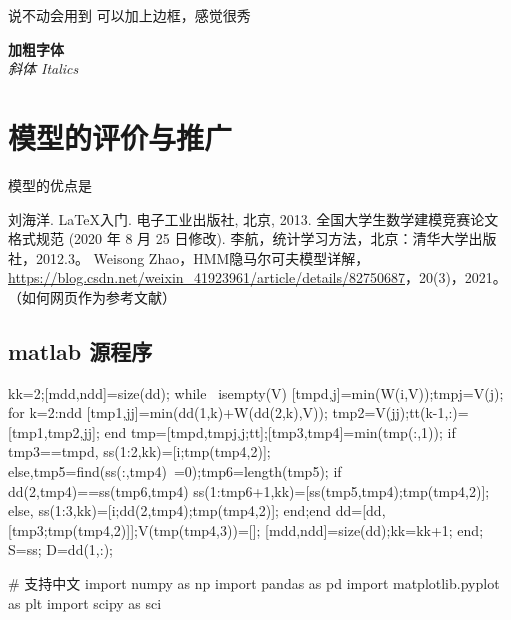 \documentclass{cumcmthesis}
\begin{document}
\begin{tcode}
	说不动会用到
	可以加上边框，感觉很秀
\end{tcode}

\par

\textbf{加粗字体}
\\
\textit{斜体 Italics}


\section{模型的评价与推广}
模型的优点是

\begin{thebibliography}{9}%
	刘海洋.
	\newblock \LaTeX {}入门\allowbreak[J].
	\newblock 电子工业出版社, 北京, 2013.
	全国大学生数学建模竞赛论文格式规范 (2020 年 8 月 25 日修改).
	李航，统计学习方法，北京：清华大学出版社，2012.3。     
	 Weisong Zhao，HMM隐马尔可夫模型详解，\url{https://blog.csdn.net/weixin_41923961/article/details/82750687}，20(3)，2021。（如何网页作为参考文献）
\end{thebibliography}

\newpage
\begin{appendices}
	
\section{matlab 源程序}
\begin{matlab}
	kk=2;[mdd,ndd]=size(dd);
	while ~isempty(V)
	[tmpd,j]=min(W(i,V));tmpj=V(j);
	for k=2:ndd
	[tmp1,jj]=min(dd(1,k)+W(dd(2,k),V));
	tmp2=V(jj);tt(k-1,:)=[tmp1,tmp2,jj];
	end
	tmp=[tmpd,tmpj,j;tt];[tmp3,tmp4]=min(tmp(:,1));
	if tmp3==tmpd, ss(1:2,kk)=[i;tmp(tmp4,2)];
	else,tmp5=find(ss(:,tmp4)~=0);tmp6=length(tmp5);
	if dd(2,tmp4)==ss(tmp6,tmp4)
	ss(1:tmp6+1,kk)=[ss(tmp5,tmp4);tmp(tmp4,2)];
	else, ss(1:3,kk)=[i;dd(2,tmp4);tmp(tmp4,2)];
	end;end
	dd=[dd,[tmp3;tmp(tmp4,2)]];V(tmp(tmp4,3))=[];
	[mdd,ndd]=size(dd);kk=kk+1;
	end; S=ss; D=dd(1,:);
\end{matlab}

\begin{python}
	# 支持中文
	import numpy as np
	import pandas as pd
	import matplotlib.pyplot as plt
	import scipy as sci
\end{python}

\end{appendices}
\end{document}

